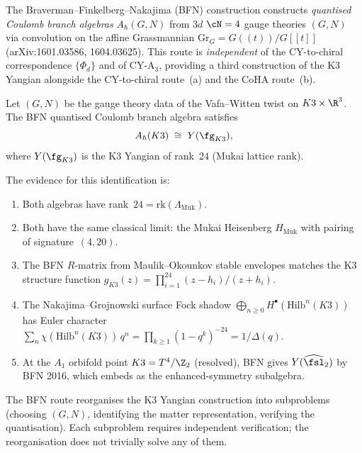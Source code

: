The Braverman--Finkelberg--Nakajima (BFN) construction constructs
\emph{quantised Coulomb branch algebras} $A_\hbar(G, N)$ from $3d$
$\cN = 4$ gauge theories $(G, N)$ via convolution on the affine
Grassmannian $\mathrm{Gr}_G = G(\!(t)\!)/G[\![t]\!]$
(arXiv:1601.03586, 1604.03625). This route is \emph{independent} of
the CY-to-chiral correspondence $\{\Phi_d\}$ and of CY-A$_3$, providing a third
construction of the K3 Yangian alongside the CY-to-chiral route~(a) and
the CoHA route~(b).

\begin{conjecture}
\label{conj:bfn-k3-yangian-mukai}
\ClaimStatusConjectured
{}%
Let $(G, N)$ be the gauge theory data of the Vafa--Witten twist
on $K3 \times \R^3$. The BFN quantised Coulomb branch algebra satisfies
\[
 A_\hbar(K3) \;\cong\; Y(\fg_{K3}),
\]
where $Y(\fg_{K3})$ is the K3 Yangian of rank~$24$ (Mukai lattice rank).

The evidence for this identification is:
\begin{enumerate}[label=\textup{(\roman*)}]
 \item Both algebras have rank~$24 = \mathrm{rk}(\Lambda_{\mathrm{Muk}})$.
 \item Both have the same classical limit: the Mukai Heisenberg
 $H_{\mathrm{Muk}}$ with pairing of signature~$(4, 20)$.
 \item The BFN $R$-matrix from Maulik--Okounkov stable envelopes
 matches the K3 structure function
 $g_{K3}(z) = \prod_{i=1}^{24} (z - h_i)/(z + h_i)$.
 \item The Nakajima--Grojnowski surface Fock shadow
 \(\bigoplus_{n\geq 0}H^\bullet(\mathrm{Hilb}^n(K3))\) has
 Euler character $\sum_n \chi(\mathrm{Hilb}^n(K3))\, q^n
 = \prod_{k \geq 1}(1 - q^k)^{-24} = 1/\Delta(q)$.
 \item At the $A_1$ orbifold point $K3 = T^4/\Z_2$
 \textup{(}resolved\textup{)}, BFN gives
 $Y(\widehat{\fsl}_2)$ by BFN 2016,
 which embeds as the enhanced-symmetry subalgebra.
\end{enumerate}

The BFN route reorganises the K3 Yangian construction into subproblems
\textup{(}choosing $(G, N)$, identifying the matter representation,
verifying the quantisation\textup{)}. Each subproblem requires
independent verification; the reorganisation does not trivially solve
any of them.
\end{conjecture}

